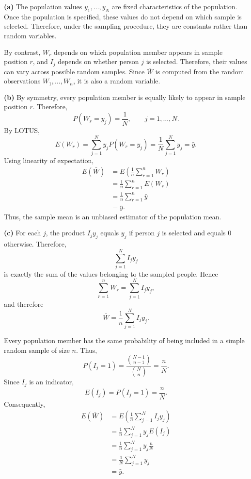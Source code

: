 \documentclass[11pt]{article}
\begin{document}
\begin{solutionbox}

\textbf{(a)}
The population values \(y_1,\dots,y_N\) are fixed characteristics of the
population. Once the population is specified, these values do not depend on
which sample is selected. Therefore, under the sampling procedure, they are
constants rather than random variables.

By contrast, \(W_r\) depends on which population member appears in sample
position \(r\), and \(I_j\) depends on whether person \(j\) is selected.
Therefore, their values can vary across possible random samples. Since
\(\bar W\) is computed from the random observations \(W_1,\dots,W_n\), it is
also a random variable.

\medskip

\textbf{(b)}
By symmetry, every population member is equally likely to appear in sample
position \(r\). Therefore,
\[
P(W_r=y_j)=\frac{1}{N},
\qquad j=1,\dots,N.
\]
By LOTUS,
\[
E(W_r)
=
\sum_{j=1}^N y_jP(W_r=y_j)
=
\frac{1}{N}\sum_{j=1}^N y_j
=
\bar y.
\]
Using linearity of expectation,
\begin{align*}
E(\bar W)
&=
E\left(\frac{1}{n}\sum_{r=1}^n W_r\right)\\
&=
\frac{1}{n}\sum_{r=1}^n E(W_r)\\
&=
\frac{1}{n}\sum_{r=1}^n \bar y\\
&=
\bar y.
\end{align*}
Thus, the sample mean is an unbiased estimator of the population mean.

\medskip

\textbf{(c)}
For each \(j\), the product \(I_jy_j\) equals \(y_j\) if person \(j\) is
selected and equals \(0\) otherwise. Therefore,
\[
\sum_{j=1}^N I_jy_j
\]
is exactly the sum of the values belonging to the sampled people. Hence
\[
\sum_{r=1}^n W_r
=
\sum_{j=1}^N I_jy_j,
\]
and therefore
\[
\bar W
=
\frac{1}{n}\sum_{j=1}^N I_jy_j.
\]

Every population member has the same probability of being included in a simple
random sample of size \(n\). Thus,
\[
P(I_j=1)
=
\frac{\binom{N-1}{n-1}}{\binom{N}{n}}
=
\frac{n}{N}.
\]
Since \(I_j\) is an indicator,
\[
E(I_j)=P(I_j=1)=\frac{n}{N}.
\]
Consequently,
\begin{align*}
E(\bar W)
&=
E\left(\frac{1}{n}\sum_{j=1}^N I_jy_j\right)\\
&=
\frac{1}{n}\sum_{j=1}^N y_jE(I_j)\\
&=
\frac{1}{n}\sum_{j=1}^N y_j\frac{n}{N}\\
&=
\frac{1}{N}\sum_{j=1}^N y_j\\
&=
\bar y.
\end{align*}


\end{solutionbox}
\end{document}
